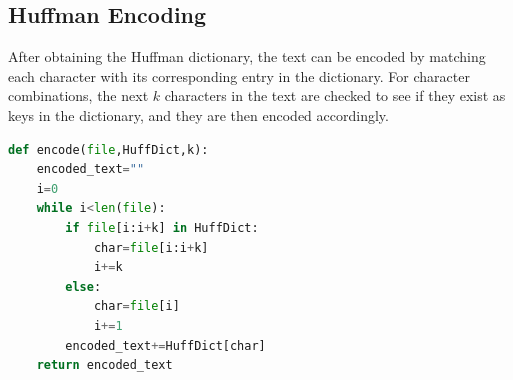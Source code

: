 \documentclass[12pt]{article}
\begin{document}
\subsection{Huffman Encoding}
After obtaining the Huffman dictionary, the text can be encoded by matching each character with its corresponding entry in the dictionary. For character combinations, the next \( k \) characters in the text are checked to see if they exist as keys in the dictionary, and they are then encoded accordingly.
\begin{tcolorbox}[colframe=black, colback=white, boxrule=0.4mm, sharp corners=southwest, title=Huffman Encoding Code]
    \begin{lstlisting}[language=Python, breaklines=true]
def encode(file,HuffDict,k):
    encoded_text=""
    i=0
    while i<len(file):
        if file[i:i+k] in HuffDict:
            char=file[i:i+k]
            i+=k
        else:
            char=file[i]
            i+=1
        encoded_text+=HuffDict[char]
    return encoded_text
\end{lstlisting}
\end{tcolorbox}
\end{document}
